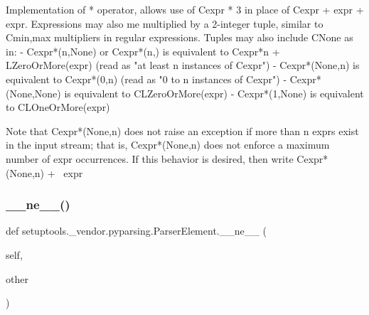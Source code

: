 \begin{DoxyVerb}Implementation of * operator, allows use of C{expr * 3} in place of
C{expr + expr + expr}.  Expressions may also me multiplied by a 2-integer
tuple, similar to C{{min,max}} multipliers in regular expressions.  Tuples
may also include C{None} as in:
 - C{expr*(n,None)} or C{expr*(n,)} is equivalent
      to C{expr*n + L{ZeroOrMore}(expr)}
      (read as "at least n instances of C{expr}")
 - C{expr*(None,n)} is equivalent to C{expr*(0,n)}
      (read as "0 to n instances of C{expr}")
 - C{expr*(None,None)} is equivalent to C{L{ZeroOrMore}(expr)}
 - C{expr*(1,None)} is equivalent to C{L{OneOrMore}(expr)}

Note that C{expr*(None,n)} does not raise an exception if
more than n exprs exist in the input stream; that is,
C{expr*(None,n)} does not enforce a maximum number of expr
occurrences.  If this behavior is desired, then write
C{expr*(None,n) + ~expr}
\end{DoxyVerb}
 \mbox{\label{classsetuptools_1_1__vendor_1_1pyparsing_1_1ParserElement_adcacf5654535d8507e7bff8634e9a3c1}} 
\subsubsection{\texorpdfstring{\+\_\+\+\_\+ne\+\_\+\+\_\+()}{\_\_ne\_\_()}}
{\footnotesize\ttfamily def setuptools.\+\_\+vendor.\+pyparsing.\+Parser\+Element.\+\_\+\+\_\+ne\+\_\+\+\_\+ (\begin{DoxyParamCaption}\item[{}]{self,  }\item[{}]{other }\end{DoxyParamCaption})}

\mbox{\label{classsetuptools_1_1__vendor_1_1pyparsing_1_1ParserElement_a3780a29c2e272d2aaf4600acde2b57f5}} 
